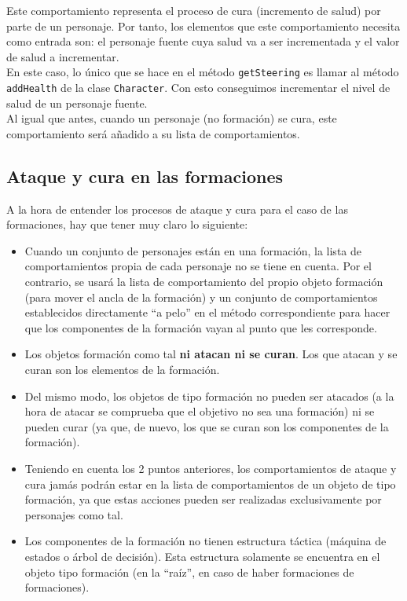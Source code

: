 Este comportamiento representa el proceso de cura (incremento de salud) por parte de un personaje. Por tanto, los elementos que este comportamiento necesita como entrada son: el personaje fuente cuya salud va a ser incrementada y el valor de salud a incrementar. \\

En este caso, lo único que se hace en el método \texttt{getSteering} es llamar al método \texttt{addHealth} de la clase \texttt{Character}. Con esto conseguimos incrementar el nivel de salud de un personaje fuente. \\

Al igual que antes, cuando un personaje (no formación) se cura, este comportamiento será añadido a su lista de comportamientos.

\subsection{Ataque y cura en las formaciones}

A la hora de entender los procesos de ataque y cura para el caso de las formaciones, hay que tener muy claro lo siguiente:
\begin{itemize}
	\item Cuando un conjunto de personajes están en una formación, la lista de comportamientos propia de cada personaje no se tiene en cuenta. Por el contrario, se usará la lista de comportamiento del propio objeto formación (para mover el ancla de la formación) y un conjunto de comportamientos establecidos directamente ``a pelo'' en el método correspondiente para hacer que los componentes de la formación vayan al punto que les corresponde.
	\item Los objetos formación como tal \textbf{ni atacan ni se curan}. Los que atacan y se curan son los elementos de la formación.
	\item Del mismo modo, los objetos de tipo formación no pueden ser atacados (a la hora de atacar se comprueba que el objetivo no sea una formación) ni se pueden curar (ya que, de nuevo, los que se curan son los componentes de la formación).
	\item Teniendo en cuenta los 2 puntos anteriores, los comportamientos de ataque y cura jamás podrán estar en la lista de comportamientos de un objeto de tipo formación, ya que estas acciones pueden ser realizadas exclusivamente por personajes como tal.
	\item Los componentes de la formación no tienen estructura táctica (máquina de estados o árbol de decisión). Esta estructura solamente se encuentra en el objeto tipo formación (en la ``raíz'', en caso de haber formaciones de formaciones).
\end{itemize}

